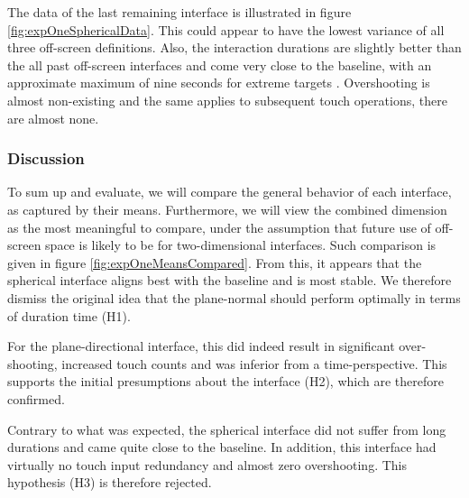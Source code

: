 
The data of the last remaining interface is illustrated in figure \ref{fig:expOneSphericalData}. This could appear to have the lowest variance of all three off-screen definitions. Also, the interaction durations are slightly better than the all past off-screen interfaces and come very close to the baseline, with an approximate maximum of nine seconds for  extreme targets . Overshooting is almost non-existing and the same applies to subsequent touch operations, there are almost none.

\begin{figure*}[!ht]
	\centering
	\vspace*{-2cm}
	\caption{The data for the spherical interface.}
	\label{fig:expOneSphericalData}
\end{figure*}



\subsubsection{Discussion}

To sum up and evaluate, we will compare the general behavior of each interface, as captured by their means. Furthermore, we will view the combined dimension as the most meaningful to compare, under the assumption that future use of off-screen space is likely to be for  two-dimensional interfaces. Such comparison is given in figure \ref{fig:expOneMeansCompared}. From this, it appears that the spherical interface aligns best with the baseline and is most stable. We therefore dismiss the original idea that the plane-normal should perform optimally in terms of duration time (H1).

For the plane-directional interface, this did indeed result in significant over-shooting, increased touch counts and was inferior from a time-perspective. This supports the initial presumptions about the interface (H2), which are therefore confirmed.

Contrary to what was expected, the spherical interface did not suffer from long durations and came quite close to the baseline. In addition, this interface had virtually no touch input redundancy and almost zero overshooting. This hypothesis (H3) is therefore rejected.

